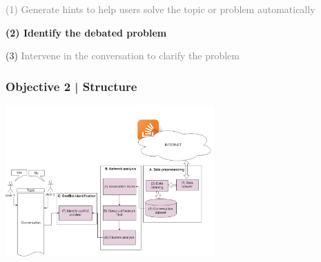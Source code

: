 \documentclass{beamer}
\begin{document}

\begin{frame}
\par 	\textcolor{gray}{(1)  Generate hints to help users solve the topic or problem automatically}
\par \textbf{(2) Identify the debated  problem }
\par (3) \textcolor{gray}{ Intervene in the conversation to clarify the problem }
\end{frame}
\begin{frame}
\frametitle{Objective 2 | Structure}


\begin{center}
	\includegraphics[width=80mm]{33.png}
\end{center}

\end{frame}
\end{document}
